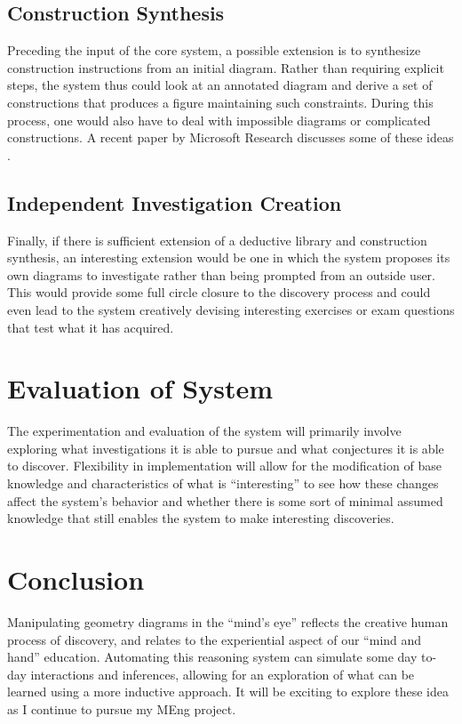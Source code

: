 \documentclass[10pt]{article}
\begin{document}
\subsection{Construction Synthesis}

Preceding the input of the core system, a possible extension is to
synthesize construction instructions from an initial diagram.  Rather
than requiring explicit steps, the system thus could look at an
annotated diagram and derive a set of constructions that produces a
figure maintaining such constraints.  During this process, one would
also have to deal with impossible diagrams or complicated
constructions.  A recent paper by Microsoft Research discusses some of
these ideas \cite{synth}.

\subsection{Independent Investigation Creation}

Finally, if there is sufficient extension of a deductive library and
construction synthesis, an interesting extension would be one in which
the system proposes its own diagrams to investigate rather than being
prompted from an outside user.  This would provide some full circle
closure to the discovery process and could even lead to the system
creatively devising interesting exercises or exam questions that test
what it has acquired.

\section{Evaluation of System}

The experimentation and evaluation of the system will primarily
involve exploring what investigations it is able to pursue and what
conjectures it is able to discover.  Flexibility in implementation
will allow for the modification of base knowledge and characteristics
of what is ``interesting'' to see how these changes affect the
system's behavior and whether there is some sort of minimal assumed
knowledge that still enables the system to make interesting
discoveries.

\section{Conclusion}

Manipulating geometry diagrams in the ``mind’s eye'' reflects the
creative human process of discovery, and relates to the experiential
aspect of our “mind and hand” education.  Automating this reasoning
system can simulate some day to-day interactions and inferences,
allowing for an exploration of what can be learned using a more
inductive approach.  It will be exciting to explore these idea as I
continue to pursue my MEng project.

 
\end{document}
